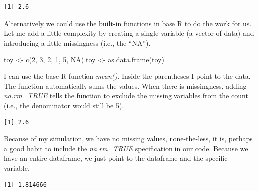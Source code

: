 \documentclass[
  11pt,
]{book}
\newenvironment{Shaded}{\begin{snugshade}}{\end{snugshade}}
\newcommand{\AttributeTok}[1]{\textcolor[rgb]{0.77,0.63,0.00}{#1}}
\newcommand{\ConstantTok}[1]{\textcolor[rgb]{0.00,0.00,0.00}{#1}}
\newcommand{\DecValTok}[1]{\textcolor[rgb]{0.00,0.00,0.81}{#1}}
\newcommand{\FunctionTok}[1]{\textcolor[rgb]{0.00,0.00,0.00}{#1}}
\newcommand{\NormalTok}[1]{#1}
\newcommand{\OtherTok}[1]{\textcolor[rgb]{0.56,0.35,0.01}{#1}}
\newcommand{\SpecialCharTok}[1]{\textcolor[rgb]{0.00,0.00,0.00}{#1}}
\begin{document}
\begin{verbatim}
[1] 2.6
\end{verbatim}

Alternatively we could use the built-in functions in base R to do the work for us. Let me add a little complexity by creating a single variable (a vector of data) and introducing a little missingness (i.e., the ``NA'').

\begin{Shaded}
\begin{Highlighting}[]
\NormalTok{toy }\OtherTok{\textless{}{-}} \FunctionTok{c}\NormalTok{(}\DecValTok{2}\NormalTok{, }\DecValTok{3}\NormalTok{, }\DecValTok{2}\NormalTok{, }\DecValTok{1}\NormalTok{, }\DecValTok{5}\NormalTok{, }\ConstantTok{NA}\NormalTok{)}
\NormalTok{toy }\OtherTok{\textless{}{-}} \FunctionTok{as.data.frame}\NormalTok{(toy)}
\end{Highlighting}
\end{Shaded}

I can use the base R function \emph{mean()}. Inside the parentheses I point to the data. The function automatically sums the values. When there is missingness, adding \emph{na.rm=TRUE} tells the function to exclude the missing variables from the count (i.e., the denominator would still be 5).

\begin{Shaded}
\end{Shaded}

\begin{verbatim}
[1] 2.6
\end{verbatim}

Because of my simulation, we have no missing values, none-the-less, it is, perhaps a good habit to include the \emph{na.rm=TRUE} specification in our code. Because we have an entire dataframe, we just point to the dataframe and the specific variable.

\begin{Shaded}
\end{Shaded}

\begin{verbatim}
[1] 1.814666
\end{verbatim}
\end{document}
